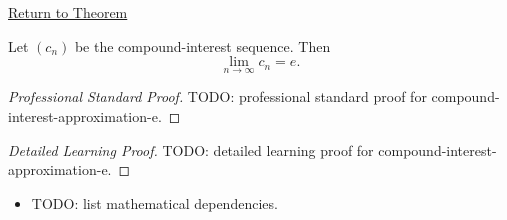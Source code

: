 \newpage
{}
\label{prf:compound-interest-approximation-e}

\begin{remark*}[Return]
\hyperref[thm:compound-interest-approximation-e]{Return to Theorem}
\end{remark*}

\begin{theorem*}
Let $(c_n)$ be the compound-interest sequence. Then
\[
  \lim_{n\to\infty}c_n=e.
\]

\smallskip
\noindent
\end{theorem*}

\begin{proof}[Professional Standard Proof]
\LRAProofBodyStart
TODO: professional standard proof for compound-interest-approximation-e.
\end{proof}

\begin{proof}[Detailed Learning Proof]
\LRAProofBodyStart
TODO: detailed learning proof for compound-interest-approximation-e.
\end{proof}

\begin{remark*}
\end{remark*}

\begin{dependencies}
\begin{itemize}
  \item TODO: list mathematical dependencies.
\end{itemize}
\end{dependencies}

\clearpage
